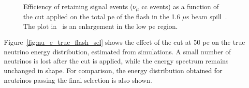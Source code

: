\begin{figure}[]
\centering
{}  
 \\ 
\caption[Flash \acrshort{pe} Cut Efficiency]{Efficiency of retaining signal events ($\nu_\mu$ \acrshort{cc} events) as a function of the cut applied on the total \acrshort{pe} of the flash in the 1.6 $\mu$s  beam spill~\protect{}. The plot in~\protect{} is an enlargement in the low \acrshort{pe} region.}
\label{fig:flash_pe_2}
\end{figure}

Figure~\ref{fig:nu_e_true_flash_sel} shows the effect of the cut at 50 \acrshort{pe} on the true neutrino energy distribution, estimated from simulations. A small number of neutrinos is lost after the cut is applied, while the energy spectrum remains unchanged in shape. For comparison, the energy distribution obtained for neutrinos passing the final selection is also shown.

